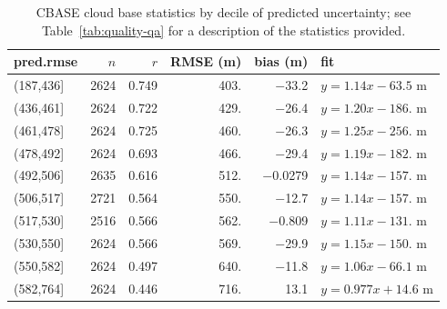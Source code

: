 \documentclass[amt,manuscript]{copernicus}\usepackage[]{graphicx}\usepackage[]{color}
\begin{document}
\begin{table}[t]
  \centering
  \caption{CBASE cloud base statistics by decile of predicted uncertainty; see
    Table~\ref{tab:quality-qa} for a description of the 
    statistics provided.}
  \label{tab:rmseclass}

\begin{tabular}{lrrrrl}
  \hline
\hline
pred.rmse & $n$ & $r$ & RMSE (m) & bias (m) & fit \\ 
  \hline
(187,436] & 2624 & 0.749 & 403. & $-$33.2 & $y = 1.14 x - 63.5$ m \\ 
  (436,461] & 2624 & 0.722 & 429. & $-$26.4 & $y = 1.20 x - 186.$ m \\ 
  (461,478] & 2624 & 0.725 & 460. & $-$26.3 & $y = 1.25 x - 256.$ m \\ 
  (478,492] & 2624 & 0.693 & 466. & $-$29.4 & $y = 1.19 x - 182.$ m \\ 
  (492,506] & 2635 & 0.616 & 512. & $-$0.0279 & $y = 1.14 x - 157.$ m \\ 
  (506,517] & 2721 & 0.564 & 550. & $-$12.7 & $y = 1.14 x - 157.$ m \\ 
  (517,530] & 2516 & 0.566 & 562. & $-$0.809 & $y = 1.11 x - 131.$ m \\ 
  (530,550] & 2624 & 0.566 & 569. & $-$29.9 & $y = 1.15 x - 150.$ m \\ 
  (550,582] & 2624 & 0.497 & 640. & $-$11.8 & $y = 1.06 x - 66.1$ m \\ 
  (582,764] & 2624 & 0.446 & 716. & 13.1 & $y = 0.977 x + 14.6$ m \\ 
   \hline
\hline
\end{tabular}

\end{table}
\end{document}
